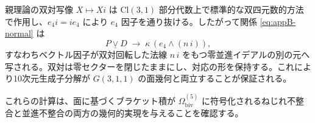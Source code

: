 \documentclass[11pt,a4paper]{article}
\begin{document}
親理論の双対写像 $X\mapsto Xi$ は $\mathrm{Cl}(3,1)$ 部分代数上で標準的な双四元数的方法で作用し、$e_{4}i=ie_{4}$ により $e_{4}$ 因子を通り抜ける。したがって関係 \eqref{eq:appB-normal} は
\[
P\mathbin{\underline{\vee}}D \;\to\; \kappa\,(e_{4}\wedge(n\,i)),
\]
すなわちベクトル因子が双対回転した法線 $n\,i$ をもつ零並進イデアルの別の元へ写される。双対は零セクターを閉じたままにし、対応の形を保持する。これにより10次元生成子分解が $G(3,1,1)$ の面幾何と両立することが保証される。

これらの計算は、面に基づくブラケット積が $\Omega_{\text{biv}}^{(5)}$ に符号化されるねじれ不整合と並進不整合の両方の幾何的実現を与えることを確認する。
\end{document}
